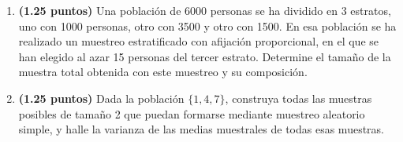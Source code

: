 
\begin{enumerate}[label=\alph*)]
\item \textbf{(1.25 puntos)} Una población de 6000 personas se ha dividido en 3 estratos, uno con 1000 personas, otro con 3500 y otro con 1500. En esa población se ha realizado un muestreo estratificado con afijación proporcional, en el que se han elegido al azar 15 personas del tercer estrato. Determine el tamaño de la muestra total obtenida con este muestreo y su composición.
\item \textbf{(1.25 puntos)} Dada la población $\{1,4,7\}$, construya todas las muestras posibles de tamaño 2 que puedan formarse mediante muestreo aleatorio simple, y halle la varianza de las medias muestrales de todas esas muestras.
\end{enumerate}
